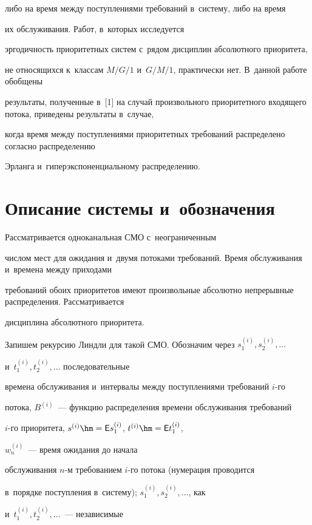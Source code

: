либо на время между поступлениями требований в~систему, либо на время

их обслуживания. Работ, в~которых исследуется

эргодичность приоритетных систем с~рядом дисциплин абсолютного приоритета,

не относящихся к~классам $M/G/1$ и~$G/M/1$, практически нет. В~данной работе обобщены

результаты, полученные в~[1] на случай произвольного приоритетного входящего потока, приведены результаты в~случае, 

когда время между поступлениями приоритетных требований распределено согласно распределению 

Эрланга и~гиперэкспоненциальному распределению.





\section{Описание системы и~обозначения}



Рассматривается одноканальная СМО с~неограниченным

числом мест для ожидания и~двумя потоками требований. Время обслуживания и~времена между приходами 

требований обоих приоритетов имеют произвольные абсолютно непрерывные распределения. Рассматривается 

дисциплина абсолютного приоритета.



Запишем рекурсию Линдли для такой СМО. Обозначим через $s_{1}^{(i)},s_{2}^{(i)},\ldots$

и~$t_{1}^{(i)},t_{2}^{(i)},\ldots$ последовательные

времена обслуживания и~интервалы между поступлениями требований $i$-го

потока, $B^{(i)}$~--- функцию распределения времени обслуживания требований

$i$-го приоритета, $s^{(i)}\hm={\sf E}s_{1}^{(i)}$, $t^{(i)}\hm={\sf E}t_{1}^{(i)}$,

{$w_{n}^{(i)}$}~--- время ожидания до начала

обслуживания $n$-м требованием $i$-го потока (нумерация проводится 

в~порядке поступления в~систему); $s_{1}^{(i)},s_{2}^{(i)},\ldots$, как

и~$t_{1}^{(i)},t_{2}^{(i)},\ldots$~--- независимые

